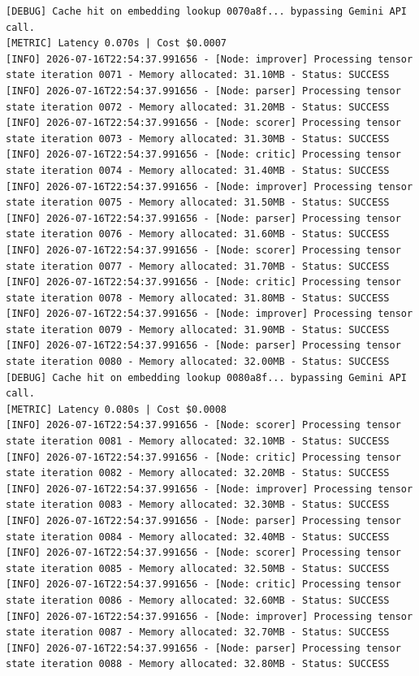 \documentclass[10pt,journal,compsoc]{IEEEtran}
\begin{document}
\begin{verbatim}
[DEBUG] Cache hit on embedding lookup 0070a8f... bypassing Gemini API call.
[METRIC] Latency 0.070s | Cost $0.0007
[INFO] 2026-07-16T22:54:37.991656 - [Node: improver] Processing tensor state iteration 0071 - Memory allocated: 31.10MB - Status: SUCCESS
[INFO] 2026-07-16T22:54:37.991656 - [Node: parser] Processing tensor state iteration 0072 - Memory allocated: 31.20MB - Status: SUCCESS
[INFO] 2026-07-16T22:54:37.991656 - [Node: scorer] Processing tensor state iteration 0073 - Memory allocated: 31.30MB - Status: SUCCESS
[INFO] 2026-07-16T22:54:37.991656 - [Node: critic] Processing tensor state iteration 0074 - Memory allocated: 31.40MB - Status: SUCCESS
[INFO] 2026-07-16T22:54:37.991656 - [Node: improver] Processing tensor state iteration 0075 - Memory allocated: 31.50MB - Status: SUCCESS
[INFO] 2026-07-16T22:54:37.991656 - [Node: parser] Processing tensor state iteration 0076 - Memory allocated: 31.60MB - Status: SUCCESS
[INFO] 2026-07-16T22:54:37.991656 - [Node: scorer] Processing tensor state iteration 0077 - Memory allocated: 31.70MB - Status: SUCCESS
[INFO] 2026-07-16T22:54:37.991656 - [Node: critic] Processing tensor state iteration 0078 - Memory allocated: 31.80MB - Status: SUCCESS
[INFO] 2026-07-16T22:54:37.991656 - [Node: improver] Processing tensor state iteration 0079 - Memory allocated: 31.90MB - Status: SUCCESS
[INFO] 2026-07-16T22:54:37.991656 - [Node: parser] Processing tensor state iteration 0080 - Memory allocated: 32.00MB - Status: SUCCESS
[DEBUG] Cache hit on embedding lookup 0080a8f... bypassing Gemini API call.
[METRIC] Latency 0.080s | Cost $0.0008
[INFO] 2026-07-16T22:54:37.991656 - [Node: scorer] Processing tensor state iteration 0081 - Memory allocated: 32.10MB - Status: SUCCESS
[INFO] 2026-07-16T22:54:37.991656 - [Node: critic] Processing tensor state iteration 0082 - Memory allocated: 32.20MB - Status: SUCCESS
[INFO] 2026-07-16T22:54:37.991656 - [Node: improver] Processing tensor state iteration 0083 - Memory allocated: 32.30MB - Status: SUCCESS
[INFO] 2026-07-16T22:54:37.991656 - [Node: parser] Processing tensor state iteration 0084 - Memory allocated: 32.40MB - Status: SUCCESS
[INFO] 2026-07-16T22:54:37.991656 - [Node: scorer] Processing tensor state iteration 0085 - Memory allocated: 32.50MB - Status: SUCCESS
[INFO] 2026-07-16T22:54:37.991656 - [Node: critic] Processing tensor state iteration 0086 - Memory allocated: 32.60MB - Status: SUCCESS
[INFO] 2026-07-16T22:54:37.991656 - [Node: improver] Processing tensor state iteration 0087 - Memory allocated: 32.70MB - Status: SUCCESS
[INFO] 2026-07-16T22:54:37.991656 - [Node: parser] Processing tensor state iteration 0088 - Memory allocated: 32.80MB - Status: SUCCESS

\end{verbatim}
\end{document}
